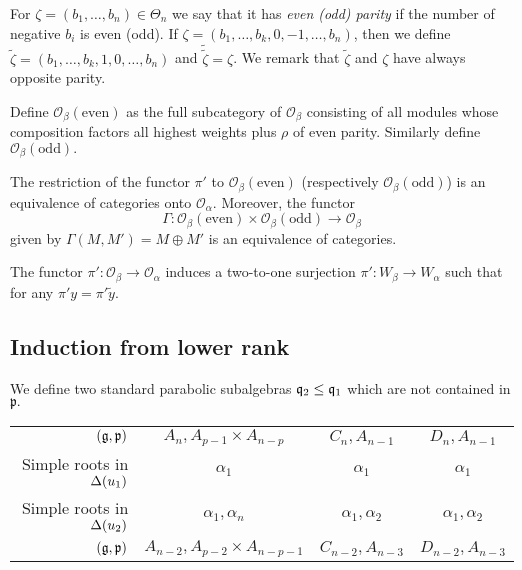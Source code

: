 \documentclass[a4paper,10pt]{article}
\begin{document}
For $\zeta = (b_1, \ldots, b_n) \in \Theta_n$  we say that it has \emph{even (odd) parity} if the number of negative $b_i$ is even (odd). If $\zeta = (b_1, \ldots, b_k, 0, -1, \ldots, b_n)$, then we define $\widetilde{\zeta} = (b_1, \ldots, b_k, 1, 0, \ldots, b_n)$ and $\widetilde{\widetilde{\zeta}} = \zeta$. We remark that $\widetilde{\zeta}$ and $\zeta$ have always opposite parity. 

Define $\mathcal{O}_\beta (\text{even})$ as the full subcategory of $\mathcal{O}_\beta$ consisting of all modules whose composition factors all highest weights plus $\rho$ of even parity. Similarly define $\mathcal{O}_\beta (\text{odd}).$

\begin{theorem}
	The restriction of the functor $\pi'$ to $\mathcal{O}_\beta (\text{even})$ (respectively  $\mathcal{O}_\beta (\text{odd})$) is an equivalence of categories onto $\mathcal{O}_\alpha$. Moreover, the functor 
	\[
		\Gamma\colon \mathcal{O}_\beta (\text{even}) \times \mathcal{O}_\beta (\text{odd}) \to \mathcal{O}_\beta
	\]
	given by $\Gamma(M, M') = M \oplus M'$ is an equivalence of categories.
\end{theorem} 

The functor $\pi'\colon \mathcal{O}_\beta \to \mathcal{O}_\alpha$ induces a two-to-one surjection $\pi': W_\beta \to W_\alpha$ such that for any $\pi' y = \pi' \widetilde{y}.$

\subsection{Induction from lower rank}

We define two standard parabolic subalgebras $\mathfrak{q}_2 \leq \mathfrak{q}_1$ which are not contained in $\mathfrak{p}.$


\medskip 
\begin{center}
\begin{tabular}{r|ccc}
	$(\mathfrak{g}, \mathfrak{p})$ & $A_n, A_{p-1} \times A_{n-p}$ &  $C_n, A_{n-1}$ & $D_n, A_{n-1}$ \\ 
	Simple roots in $\Delta(u_1)$ & $\alpha_1$ & $\alpha_1$ & $\alpha_1$ \\
	Simple roots in $\Delta(u_2)$ & $\alpha_1, \alpha_n$ & $\alpha_1, \alpha_2$ & $\alpha_1, \alpha_2$ \\ 
	$(\mathfrak{g}, \mathfrak{p})$ & $A_{n-2}, A_{p-2} \times A_{n-p-1}$ &  $C_{n-2}, A_{n-3}$ & $D_{n-2}, A_{n-3}$ \\ 
\end{tabular}
\end{center}
\end{document}
